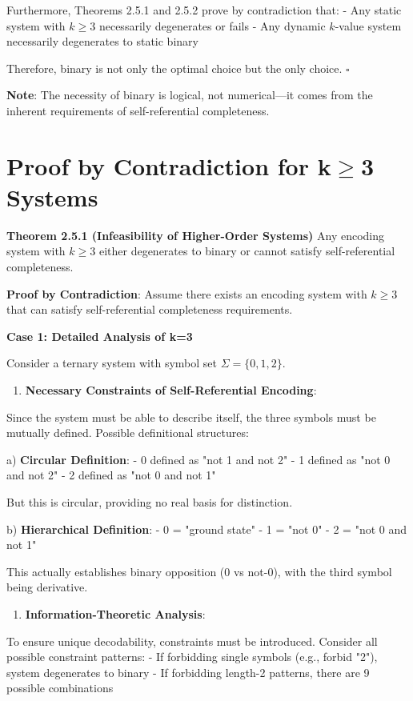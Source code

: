    Furthermore, Theorems 2.5.1 and 2.5.2 prove by contradiction that:
   - Any static system with $k \geq 3$ necessarily degenerates or fails
   - Any dynamic $k$-value system necessarily degenerates to static binary
   
Therefore, binary is not only the optimal choice but the only choice. $\square$

\textbf{Note}: The necessity of binary is logical, not numerical---it comes from the inherent requirements of self-referential completeness.

\section{Proof by Contradiction for k$\geq$3 Systems}
\label{sec:ch02_encoding:proof-by-contradiction-for-k-geq-3-systems}

\textbf{Theorem 2.5.1 (Infeasibility of Higher-Order Systems)}
\label{thm:2.5.1}
Any encoding system with $k \geq 3$ either degenerates to binary or cannot satisfy self-referential completeness.

\textbf{Proof by Contradiction}:
Assume there exists an encoding system with $k \geq 3$ that can satisfy self-referential completeness requirements.

\textbf{Case 1: Detailed Analysis of k=3}

Consider a ternary system with symbol set $\Sigma = \{0, 1, 2\}$.

\begin{enumerate}
\item \textbf{Necessary Constraints of Self-Referential Encoding}:
\end{enumerate}
   Since the system must be able to describe itself, the three symbols must be mutually defined. Possible definitional structures:
   
   a) \textbf{Circular Definition}:
   - 0 defined as "not 1 and not 2"
   - 1 defined as "not 0 and not 2"  
   - 2 defined as "not 0 and not 1"
   
   But this is circular, providing no real basis for distinction.

   b) \textbf{Hierarchical Definition}:
   - 0 = "ground state"
   - 1 = "not 0"
   - 2 = "not 0 and not 1"
   
   This actually establishes binary opposition (0 vs not-0), with the third symbol being derivative.

\begin{enumerate}
\item \textbf{Information-Theoretic Analysis}:
\end{enumerate}
   To ensure unique decodability, constraints must be introduced. Consider all possible constraint patterns:
   - If forbidding single symbols (e.g., forbid "2"), system degenerates to binary
   - If forbidding length-2 patterns, there are 9 possible combinations
   
